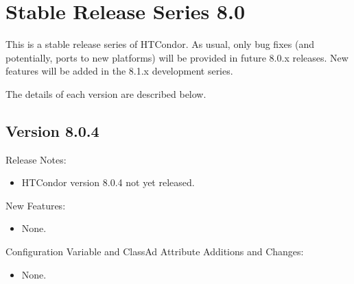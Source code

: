 
\section{\label{sec:History-8-0}Stable Release Series 8.0}

This is a stable release series of HTCondor.
As usual, only bug fixes (and potentially, ports to new platforms)
will be provided in future 8.0.x releases.
New features will be added in the 8.1.x development series.

The details of each version are described below.

\subsection*{\label{sec:New-8-0-4}Version 8.0.4}

\noindent Release Notes:

\begin{itemize}

\item HTCondor version 8.0.4 not yet released.

\end{itemize}


\noindent New Features:

\begin{itemize}

\item None.

\end{itemize}

\noindent Configuration Variable and ClassAd Attribute Additions and Changes:

\begin{itemize}

\item None.

\end{itemize}

